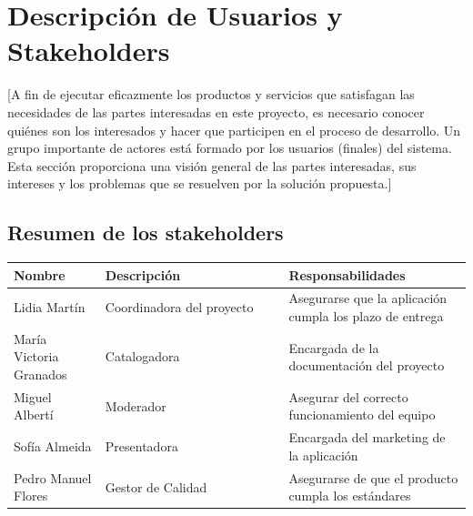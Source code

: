 \documentclass[11pt]{article}
\begin{document}
\section{Descripción de Usuarios y Stakeholders}
[A fin de ejecutar eficazmente los productos y servicios que satisfagan las necesidades de las partes interesadas en este proyecto, es necesario conocer quiénes son los interesados y hacer que participen en el proceso de desarrollo. Un grupo importante de actores está formado por los usuarios (finales) del sistema.
Esta sección proporciona una visión general de las partes interesadas, sus intereses y los problemas que se resuelven por la solución propuesta.]

\subsection{Resumen de los stakeholders}
\begin{table}[H]
  \centering
  \begin{tabular}{p{0.2\linewidth}p{0.4\linewidth}p{0.4\linewidth}}
    \toprule
    \textbf{Nombre} & \textbf{Descripción} & \textbf{Responsabilidades} \\
    \midrule
    Lidia Martín & Coordinadora del proyecto & Asegurarse que la aplicación cumpla los plazo de entrega\\
    María Victoria Granados & Catalogadora & Encargada de la documentación del proyecto\\
    Miguel Albertí & Moderador & Asegurar del correcto funcionamiento del equipo\\
    Sofía Almeida & Presentadora & Encargada del marketing de la aplicación\\
    Pedro Manuel Flores & Gestor de Calidad & Asegurarse de que el producto cumpla los estándares\\
    \bottomrule
  \end{tabular}
\end{table}
\end{document}
